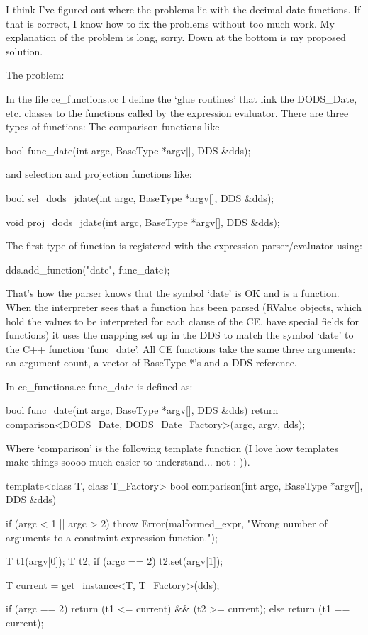 \documentclass[12pt]{article}
\begin{document}
%

I think I've figured out where the problems lie with the decimal date
functions. If that is correct, I know how to fix the problems without too
much work. My explanation of the problem is long, sorry. Down at the bottom
is my proposed solution.

The problem:

In the file ce_functions.cc I define the `glue routines' that link the
DODS_Date, etc. classes to the functions called by the expression evaluator.
There are three types of functions: The comparison functions like

    bool func_date(int argc, BaseType *argv[], DDS &dds);

and selection and projection functions like:

    bool sel_dods_jdate(int argc, BaseType *argv[], DDS &dds);

    void proj_dods_jdate(int argc, BaseType *argv[], DDS &dds);

The first type of function is registered with the expression parser/evaluator
using: 

    dds.add_function("date", func_date);

That's how the parser knows that the symbol `date' is OK and is a function.
When the interpreter sees that a function has been parsed (RValue objects,
which hold the values to be interpreted for each clause of the CE, have
special fields for functions) it uses the mapping set up in the DDS to match
the symbol `date' to the C++ function `func_date'. All CE functions take the
same three arguments: an argument count, a vector of BaseType *'s and a DDS
reference. 

In ce_functions.cc func_date is defined as:

    bool
    func_date(int argc, BaseType *argv[], DDS &dds)
    {
        return comparison<DODS_Date, DODS_Date_Factory>(argc, argv, dds);
    }

Where `comparison' is the following template function (I love how templates
make things soooo much easier to understand... not :-)).

    template<class T, class T_Factory>
    bool
    comparison(int argc, BaseType *argv[], DDS &dds)
    {
        if (argc < 1 || argc > 2)
            throw Error(malformed_expr,
                        "Wrong number of arguments to a constraint expression 
                         function.");

        T t1(argv[0]);
        T t2;
        if (argc == 2)
            t2.set(argv[1]);

        T current = get_instance<T, T_Factory>(dds);

        if (argc == 2)
            return (t1 <= current) && (t2 >= current);
        else
            return (t1 == current);
    }
\end{document}
